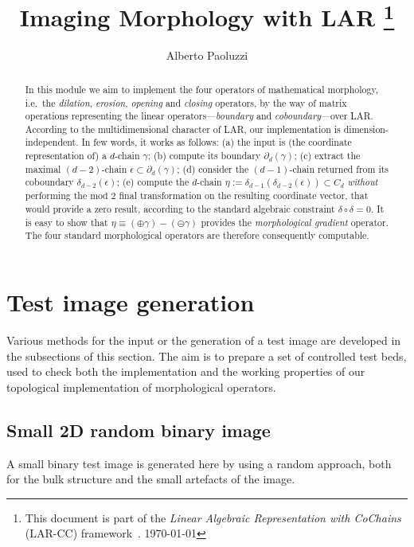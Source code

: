\documentclass[11pt,oneside]{article}	%
\title{Imaging Morphology with LAR
\footnote{This document is part of the \emph{Linear Algebraic Representation with CoChains} (LAR-CC) framework~\cite{cclar-proj:2013:00}. \today}
}
\author{Alberto Paoluzzi}
\begin{document}
\maketitle
\nonstopmode

\begin{abstract}
In this module we aim to implement the four operators of mathematical morphology, i.e.~the \emph{dilation}, \emph{erosion}, \emph{opening} and \emph{closing} operators, by the way of matrix operations representing the linear operators---\emph{boundary} and \emph{coboundary}---over LAR. 
According to the multidimensional character of LAR, our implementation is dimension-independent.
In few words, it works as follows: (a)  the input is (the coordinate representation of) a $d$-chain $\gamma$; (b) compute its boundary $\partial_d(\gamma)$; (c) extract the maximal $(d-2)$-chain $\epsilon \subset \partial_d(\gamma)$; (d) consider the $(d-1)$-chain returned from its coboundary $\delta_{d-2}(\epsilon)$; (e) compute the $d$-chain $\eta := \delta_{d-1}(\delta_{d-2}(\epsilon)) \subset C_d$ \emph{without} performing the  $\mbox{mod\ 2}$ final transformation on the resulting coordinate vector, that would provide a zero result, according to the standard algebraic constraint $\delta\circ\delta=0$. It is easy to show that $\eta \equiv (\oplus \gamma) - (\ominus \gamma)$ provides the \emph{morphological gradient} operator. The four standard morphological operators are therefore  consequently computable.
\end{abstract}

\tableofcontents

\section{Test image generation}

Various methods for the input or the generation of a test image  are developed in the subsections of this section. The aim is to prepare a set of controlled test beds, used to check both the implementation and the working properties of our topological implementation of morphological operators. 


\subsection{Small 2D random binary image}

A small binary test image is generated here by using a random approach, both for the bulk structure and the small artefacts of the image.  
\end{document}
